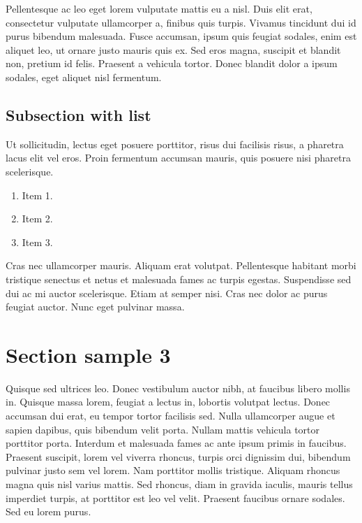 %

Pellentesque ac leo eget lorem vulputate mattis eu a nisl. Duis elit erat, consectetur vulputate ullamcorper a, finibus quis turpis. Vivamus tincidunt dui id purus bibendum malesuada. Fusce accumsan, ipsum quis feugiat sodales, enim est aliquet leo, ut ornare justo mauris quis ex. Sed eros magna, suscipit et blandit non, pretium id felis. Praesent a vehicula tortor. Donec blandit dolor a ipsum sodales, eget aliquet nisl fermentum.

\subsection{Subsection with list}

Ut sollicitudin, lectus eget posuere porttitor, risus dui facilisis risus, a pharetra lacus elit vel eros. Proin fermentum accumsan mauris, quis posuere nisi pharetra scelerisque. 
\begin{enumerate}
  \item Item 1.
  \item Item 2.
  \item Item 3.
\end{enumerate}

Cras nec ullamcorper mauris. Aliquam erat volutpat. Pellentesque habitant morbi tristique senectus et netus et malesuada fames ac turpis egestas. Suspendisse sed dui ac mi auctor scelerisque. Etiam at semper nisi. Cras nec dolor ac purus feugiat auctor. Nunc eget pulvinar massa.

%

\section{Section sample 3}

Quisque sed ultrices leo. Donec vestibulum auctor nibh, at faucibus libero mollis in. Quisque massa lorem, feugiat a lectus in, lobortis volutpat lectus. Donec accumsan dui erat, eu tempor tortor facilisis sed. Nulla ullamcorper augue et sapien dapibus, quis bibendum velit porta. Nullam mattis vehicula tortor porttitor porta. Interdum et malesuada fames ac ante ipsum primis in faucibus. Praesent suscipit, lorem vel viverra rhoncus, turpis orci dignissim dui, bibendum pulvinar justo sem vel lorem. Nam porttitor mollis tristique. Aliquam rhoncus magna quis nisl varius mattis. Sed rhoncus, diam in gravida iaculis, mauris tellus imperdiet turpis, at porttitor est leo vel velit. Praesent faucibus ornare sodales. Sed eu lorem purus.  

